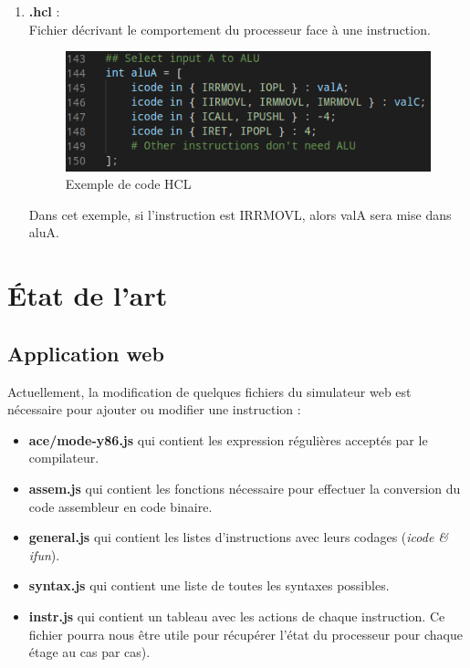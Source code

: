 \documentclass[french]{article}
\begin{document}
\begin{enumerate}
    \item \textbf{.hcl} :\\
    Fichier décrivant le comportement du processeur face à une instruction.\\
    \begin{figure}[H]
        \centering
        \includegraphics{img/ex_hcl.png}
        \caption{Exemple de code HCL}
        \label{fig:ex_hcl}
    \end{figure}
    Dans cet exemple, si l'instruction est IRRMOVL, alors valA sera mise dans aluA.
\end{enumerate}

\section{État de l'art}

\subsection{Application web \cite{webapp-ub}}

Actuellement, la modification de quelques fichiers du simulateur web est nécessaire pour ajouter ou modifier une instruction :
\begin{itemize}
    \item \textbf{ace/mode-y86.js} qui contient les expression régulières acceptés par le compilateur.
    \item \textbf{assem.js} qui contient les fonctions nécessaire pour effectuer la conversion du code assembleur en code binaire.
    \item \textbf{general.js} qui contient les listes d'instructions avec leurs codages (\textit{icode \& ifun}).
    \item \textbf{syntax.js} qui contient une liste de toutes les syntaxes possibles.
    \item \textbf{instr.js} qui contient un tableau avec les actions de chaque instruction. Ce fichier pourra nous être utile pour récupérer l'état du processeur pour chaque étage au cas par cas). \\
\end{itemize}
\end{document}
